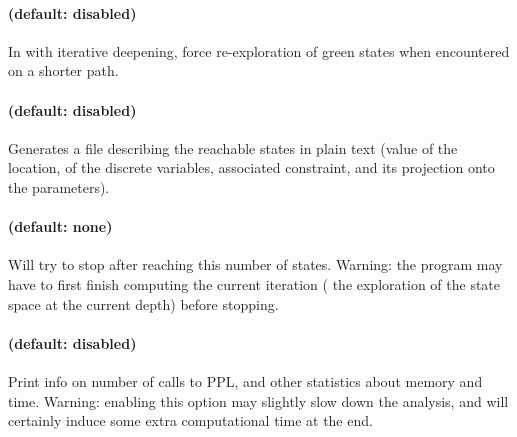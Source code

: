 \paragraph{ (default: disabled)}
In  with iterative deepening, force re-exploration of
green states when encountered on a shorter path.




\paragraph{ (default: disabled)}
Generates a file  describing the reachable states in plain text (value of the location, of the discrete variables, associated constraint, and its projection onto the parameters).




\paragraph{ (default: none)}
Will try to stop after reaching this number of states.
Warning: the program may have to first finish computing the current iteration (\ie{} the exploration of the state space at the current depth) before stopping.


\paragraph{ (default: disabled)}
Print info on number of calls to PPL, and other statistics about memory and time.
Warning: enabling this option may slightly slow down the analysis, and will certainly induce some extra computational time at the end.



